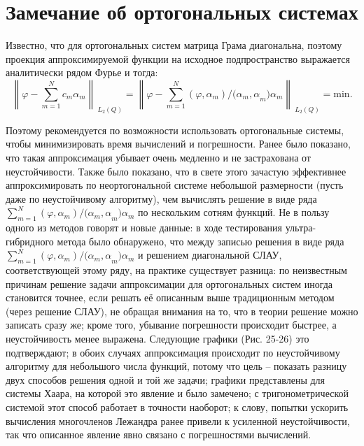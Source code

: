﻿\documentclass[a4paper, 12pt]{article}
\begin{document}
\section{Замечание об ортогональных системах}

Известно, что для ортогональных систем матрица Грама диагональна, поэтому проекция аппроксимируемой функции на исходное подпространство выражается аналитически рядом Фурье и тогда:
\begin{equation}{\left\|\varphi -\sum^N_{m=1}{c_m}{\alpha }_m\right\|}_{{\ L}_2\left(Q\right)}={\left\|\varphi -\sum^N_{m=1}{\left(\varphi ,{\alpha }_m\right)/{({\alpha }_m,\alpha }_m)}{\alpha }_m\right\|}_{{\ L}_2\left(Q\right)}=\mathrm{min}.\end{equation}

Поэтому рекомендуется по возможности использовать ортогональные системы, чтобы минимизировать время вычислений и погрешности. Ранее было показано, что такая аппроксимация убывает очень медленно и не застрахована от неустойчивости. Также было показано, что в свете этого зачастую эффективнее аппроксимировать по неортогональной системе небольшой размерности (пусть даже по неустойчивому алгоритму), чем вычислять решение в виде ряда $\sum^N_{m=1}{\left(\varphi ,{\alpha }_m\right)/{({\alpha }_m,\alpha }_m)}{\alpha }_m$ по нескольким сотням функций. Не в пользу одного из методов говорят и новые данные: в ходе тестирования ультра-гибридного метода было обнаружено, что между записью решения в виде ряда $\sum^N_{m=1}{\left(\varphi ,{\alpha }_m\right)/{({\alpha }_m,\alpha }_m)}{\alpha }_m$ и решением диагональной СЛАУ, соответствующей этому ряду, на практике существует разница: по неизвестным причинам решение задачи аппроксимации для ортогональных систем иногда становится точнее, если решать её описанным выше традиционным методом (через решение СЛАУ), не обращая внимания на то, что в теории решение можно записать сразу же; кроме того, убывание погрешности происходит быстрее, а неустойчивость менее выражена. Следующие графики (Рис. 25-26) это подтверждают; в обоих случаях аппроксимация происходит по неустойчивому алгоритму для небольшого числа функций, потому что цель -- показать разницу двух способов решения одной и той же задачи; графики представлены для системы Хаара, на которой это явление и было замечено; с тригонометрической системой этот способ работает в точности наоборот; к слову, попытки ускорить вычисления многочленов Лежандра ранее привели к усиленной неустойчивости, так что описанное явление явно связано с погрешностями вычислений. 
\end{document}
